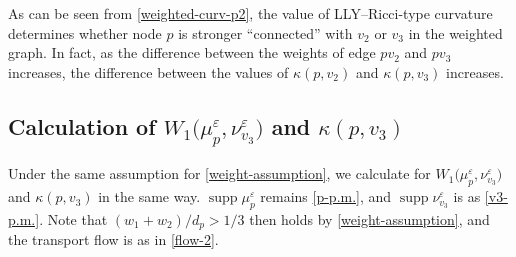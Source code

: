 \documentclass{article}
\numberwithin{equation}{section}
\theoremstyle{definition}
\newcommand{\K}{\kappa}
\newcommand{\eps}{\varepsilon} %
\DeclareMathOperator\supp{supp} %
\begin{document}
As can be seen from \eqref{weighted-curv-p2}, the value of LLY--Ricci-type curvature determines whether node $p$ is stronger ``connected'' with $v_2$ or $v_3$ in the weighted graph.
In fact, as the difference between the weights of edge $pv_2$ and $pv_3$ increases, the difference between the values of $\K(p,v_2)$ and $\K(p,v_3)$ increases.

\subsection*{Calculation of $W_1\big(\mu_p^\eps,\nu_{v_3}^\eps\big)$ and $\K(p,v_3)$}

Under the same assumption for \eqref{weight-assumption}, we calculate for $W_1\big(\mu_p^\eps,\nu_{v_3}^\eps\big)$ and $\K(p,v_3)$ in the same way.
$\supp\mu_p^\eps$ remains \autoref{p-p.m.}, and $\supp\nu_{v_3}^\eps$ is as \autoref{v3-p.m.}.
Note that $(w_1+w_2)/d_p>1/3$ then holds by \eqref{weight-assumption}, and the transport flow is as in \autoref{flow-2}.
\end{document}
